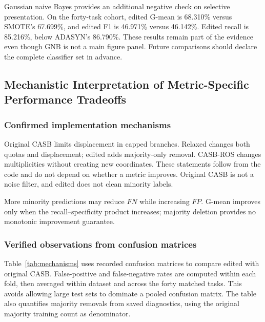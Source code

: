 \documentclass[conference]{IEEEtran}
\begin{document}
Gaussian naive Bayes provides an additional negative check on selective presentation. On the forty-task cohort, edited G-mean is 68.310\% versus SMOTE's 67.699\%, and edited F1 is 46.971\% versus 46.142\%. Edited recall is 85.216\%, below ADASYN's 86.790\%. These results remain part of the evidence even though GNB is not a main figure panel. Future comparisons should declare the complete classifier set in advance.


\subsection{Mechanistic Interpretation of Metric-Specific Performance Tradeoffs}
\subsubsection{Confirmed implementation mechanisms}
Original CASB limits displacement in capped branches. Relaxed changes both quotas and displacement; edited adds majority-only removal. CASB-ROS changes multiplicities without creating new coordinates. These statements follow from the code and do not depend on whether a metric improves. Original CASB is not a noise filter, and edited does not clean minority labels.

More minority predictions may reduce $FN$ while increasing $FP$. G-mean improves only when the recall--specificity product increases; majority deletion provides no monotonic improvement guarantee.

\subsubsection{Verified observations from confusion matrices}
Table~\ref{tab:mechanisms} uses recorded confusion matrices to compare edited with original CASB. False-positive and false-negative rates are computed within each fold, then averaged within dataset and across the forty matched tasks. This avoids allowing large test sets to dominate a pooled confusion matrix. The table also quantifies majority removals from saved diagnostics, using the original majority training count as denominator.
\end{document}
